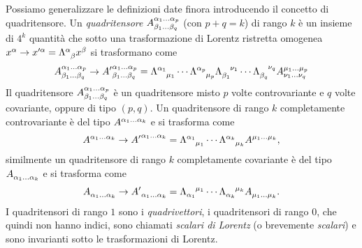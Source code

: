 Possiamo generalizzare le definizioni date finora introducendo il concetto di
quadritensore.  Un \emph{quadritensore}
$\tensor*{A}{^{\alpha_{1}\dots\alpha_{p}}_{\beta_{1}\dots\beta_{q}}}$ (con
$p + q = k$) di rango $k$ è un insieme di $4^{k}$ quantità che sotto una
trasformazione di Lorentz ristretta omogenea
$x^{\alpha} \to x'^{\alpha} = \tensor{\Lambda}{^{\alpha}_{\beta}}x^{\beta}$ si
trasformano come
\begin{equation}
  \tensor*{A}{^{\alpha_{1}\dots\alpha_{p}}_{\beta_{1}\dots\beta_{q}}} \to
  \tensor*{{A'}}{^{\alpha_{1}\dots\alpha_{p}}_{\beta_{1}\dots\beta_{q}}} =
  \tensor{\Lambda}{^{\alpha_{1}}_{\mu_{1}}} \cdots
  \tensor{\Lambda}{^{\alpha_{p}}_{\mu_{p}}}
  \tensor{\Lambda}{_{\beta_{1}}^{\nu_{1}}} \cdots
  \tensor{\Lambda}{_{\beta_{q}}^{\nu_{q}}}
  \tensor*{A}{^{\mu_{1}\dots\mu_{p}}_{\nu_{1}\dots\nu_{q}}}
\end{equation}
Il quadritensore
$\tensor*{A}{^{\alpha_{1}\dots\alpha_{p}}_{\beta_{1}\dots\beta_{q}}}$ è un
quadritensore misto $p$ volte controvariante e $q$ volte covariante, oppure di
tipo $(p,q)$.  Un quadritensore di rango $k$ completamente controvariante è del
tipo $\tensor{A}{^{\alpha_{1}\dots\alpha_{k}}}$ e si trasforma come
\begin{equation}
  \tensor{A}{^{\alpha_{1}\dots\alpha_{k}}} \to
  \tensor{{A'}}{^{\alpha_{1}\dots\alpha_{k}}} =
  \tensor{\Lambda}{^{\alpha_{1}}_{\mu_{1}}} \cdots
  \tensor{\Lambda}{^{\alpha_{k}}_{\mu_{k}}} \tensor{A}{^{\mu_{1}\dots\mu_{k}}},
\end{equation}
similmente un quadritensore di rango $k$ completamente covariante è del tipo
$\tensor{A}{_{\alpha_{1}\dots\alpha_{k}}}$ e si trasforma come
\begin{equation}
  \tensor{A}{_{\alpha_{1}\dots\alpha_{k}}} \to
  \tensor{{A'}}{_{\alpha_{1}\dots\alpha_{k}}} =
  \tensor{\Lambda}{_{\alpha_{1}}^{\mu_{1}}} \cdots
  \tensor{\Lambda}{_{\alpha_{k}}^{\mu_{k}}} \tensor{A}{_{\mu_{1}\dots\mu_{k}}}.
\end{equation}
I quadritensori di rango $1$ sono i \emph{quadrivettori}, i
quadritensori di rango $0$, che quindi non hanno indici, sono chiamati
\emph{scalari di Lorentz} (o brevemente
\emph{scalari}) e sono invarianti sotto le trasformazioni di Lorentz.

